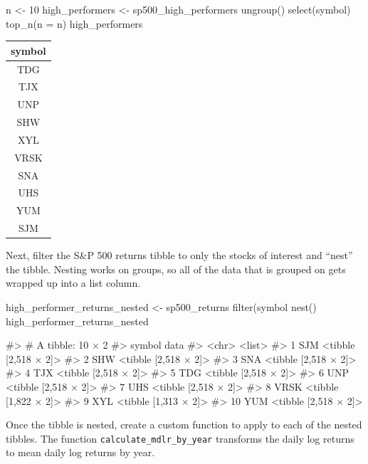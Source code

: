 \begin{Schunk}
\begin{Sinput}
n <- 10
high_performers <- sp500_high_performers %
    ungroup() %
    select(symbol) %
    top_n(n = n)
high_performers
\end{Sinput}
\end{Schunk}

\begin{tabular}{c}
\toprule
symbol\\
\midrule
TDG\\
TJX\\
UNP\\
SHW\\
XYL\\
\addlinespace
VRSK\\
SNA\\
UHS\\
YUM\\
SJM\\
\bottomrule
\end{tabular}

\hspace{20 mm}

Next, filter the S\&P 500 returns tibble to only the stocks of interest
and ``nest'' the tibble. Nesting works on groups, so all of the data
that is grouped on gets wrapped up into a list column.

\begin{Schunk}
\begin{Sinput}
high_performer_returns_nested <- sp500_returns %
    filter(symbol %
    nest()
high_performer_returns_nested
\end{Sinput}
\begin{Soutput}
#> # A tibble: 10 × 2
#>    symbol                 data
#>     <chr>               <list>
#> 1     SJM <tibble [2,518 × 2]>
#> 2     SHW <tibble [2,518 × 2]>
#> 3     SNA <tibble [2,518 × 2]>
#> 4     TJX <tibble [2,518 × 2]>
#> 5     TDG <tibble [2,518 × 2]>
#> 6     UNP <tibble [2,518 × 2]>
#> 7     UHS <tibble [2,518 × 2]>
#> 8    VRSK <tibble [1,822 × 2]>
#> 9     XYL <tibble [1,313 × 2]>
#> 10    YUM <tibble [2,518 × 2]>
\end{Soutput}
\end{Schunk}

\hspace{20 mm}

Once the tibble is nested, create a custom function to apply to each of
the nested tibbles. The function \texttt{calculate\_mdlr\_by\_year}
transforms the daily log returns to mean daily log returns by year.

